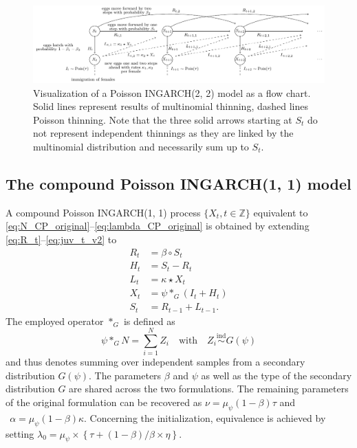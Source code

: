\documentclass[review]{elsarticle}
\begin{document}
\begin{figure}[h!]
\center
\includegraphics[scale = 0.8]{figure/flowchart_ingarch_poisson_pq.pdf}
\caption{Visualization of a Poisson INGARCH(2, 2) model as a flow chart. Solid lines represent results of multinomial thinning, dashed lines Poisson thinning. Note that the three solid arrows starting at $S_t$ do not represent independent thinnings as they are linked by the multinomial distribution and necessarily sum up to $S_t$.}
\label{fig:ingarch_flowchart_poisson_pq}

\end{figure}


\subsection{The compound Poisson INGARCH(1, 1) model}

A compound Poisson INGARCH(1, 1) process $\{X_t, t \in \mathbb{Z}\}$ equivalent to \eqref{eq:N_CP_original}--\eqref{eq:lambda_CP_original} is obtained by extending \eqref{eq:R_t}--\eqref{eq:juv_t_v2} to
\begin{align}
R_t & = \beta \circ S_t \label{eq:R_t_CP}\\
H_t & = S_t - R_t \label{eq:H_t_CP}\\
L_t & = \kappa \star X_t \label{eq:L_t_CP}\\
X_t & = \psi *_G (I_t + H_t)\label{eq:X_t_CP} \\
S_t & = R_{t - 1} + L_{t - 1}.\label{eq:juv_t_CP}
\end{align}
The employed operator $*_G$ is defined as
$$
\psi *_G N = \sum_{i = 1}^N Z_i \ \ \ \text{ with } \ \ \ Z_i \stackrel{\text{ind}}{\sim} G(\psi)
$$
and thus denotes summing over independent samples from a secondary distribution $G(\psi)$. The parameters $\beta$ and $\psi$ as well as the type of the secondary distribution $G$ are shared across the two formulations. The remaining parameters of the original formulation can be recovered as
$
\nu = \mu_\psi(1 - \beta)\tau$ and $ \ \
\alpha = \mu_\psi(1 - \beta)\kappa.
$
Concerning the initialization, equivalence is achieved by setting $\lambda_0 = \mu_\psi\times \left\{\tau + (1 - \beta)/\beta \times \eta\right\}$.
\end{document}
